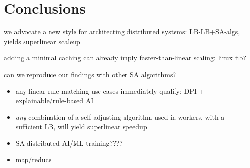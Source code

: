 \section{Conclusions}\label{sec:conclusions}

we advocate a new style for architecting distributed systems: LB-LB+SA-algs, yields superlinear scaleup

adding a minimal caching can already imply faster-than-linear scaling: linux fib? 

can we reproduce our findings with other SA algorithms?
\begin{itemize}
\item any linear rule matching use cases immediately qualify: DPI + explainable/rule-based AI
\item \emph{any} combination of a self-adjusting algorithm used in workers, with a sufficient LB, will yield superlinear speedup
\item SA distributed AI/ML training????
\item map/reduce
\end{itemize}


